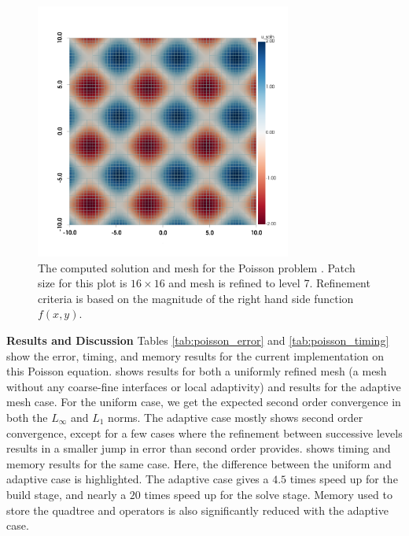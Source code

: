 \begin{figure}
    \centering
    \includegraphics[width=0.75\textwidth, trim={0 100 0 0}]{../figures/plot_poisson.png}
    \caption{The computed solution and mesh for the Poisson problem .  Patch size for this plot is $16 \times 16$ and mesh is refined to level 7.  Refinement criteria is based on the magnitude of the right hand side function $f(x,y)$.}
    \label{fig:poisson_plot}
\end{figure}

{\bf Results and Discussion}
Tables \ref{tab:poisson_error} and \ref{tab:poisson_timing} show the error, timing, and memory results for the current implementation on this Poisson equation.  shows results for both a uniformly refined mesh (a mesh without any coarse-fine interfaces or local adaptivity) and results for the adaptive mesh case. For the uniform case, we get the expected second order convergence in both the $L_{\infty}$ and $L_1$ norms. The adaptive case mostly shows second order convergence, except for a few cases where the refinement between successive levels results in a smaller jump in error than second order provides.  shows timing and memory results for the same case. Here, the difference between the uniform and adaptive case is highlighted. The adaptive case gives a $4.5$ times speed up for the build stage, and nearly a $20$ times speed up for the solve stage. Memory used to store the quadtree and operators is also significantly reduced with the adaptive case.

